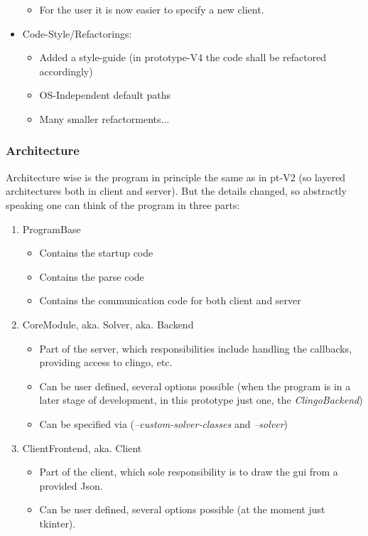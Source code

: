 \documentclass[12pt,a4paper]{article}
\newcommand{\<}[1]{\guilsinglleft}
\renewcommand{\>}[1]{\guilsinglright}
\begin{document}
\begin{itemize}
\begin{itemize}
        \item For the user it is now easier to specify a new client.
    \end{itemize}
    \item Code-Style/Refactorings:
    \begin{itemize}
        \item Added a style-guide (in prototype-V4 the code shall be refactored accordingly)
        \item OS-Independent default paths  
        \item Many smaller refactorments...
    \end{itemize}
\end{itemize}

\subsubsection{Architecture}

\noindent Architecture wise is the program in principle the same as in pt-V2 (so layered architectures both in client and server). But the details changed, so abstractly speaking one can think of the program in three parts:

\begin{enumerate}
    \item ProgramBase
    \begin{itemize}
        \item Contains the startup code
        \item Contains the parse code
        \item Contains the communication code for both client and server
    \end{itemize}
    \item CoreModule, aka. Solver, aka. Backend
    \begin{itemize}
        \item Part of the server, which responsibilities include handling the callbacks, providing access to clingo, etc.
        \item Can be user defined, several options possible (when the program is in a later stage of development, in this prototype just one, the \textit{ClingoBackend})
        \item Can be specified via (\textit{--custom-solver-classes} and \textit{--solver})
    \end{itemize}
    \item ClientFrontend, aka. Client
    \begin{itemize}
        \item Part of the client, which sole responsibility is to draw the gui from a provided Json.
        \item Can be user defined, several options possible (at the moment just tkinter).
    \end{itemize}
\end{enumerate}
\end{document}
